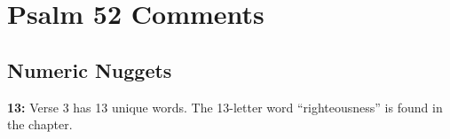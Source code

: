 \section{Psalm 52 Comments}

\subsection{Numeric Nuggets}
\textbf{13: } Verse 3 has 13 unique words. The 13-letter word ``righteousness'' is found in the chapter.